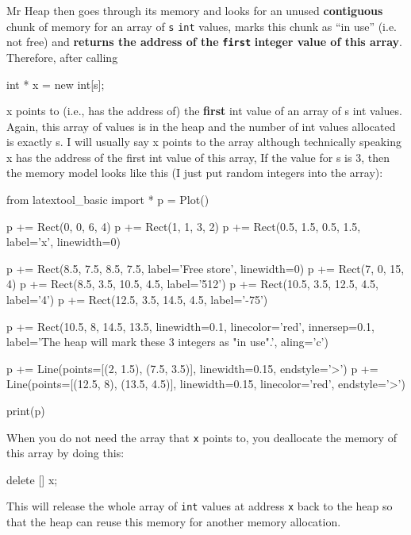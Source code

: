 Mr Heap then goes through its memory and looks for an unused
\textbf{contiguous} chunk of memory for an array of \texttt{s} \texttt{int}
values, marks this chunk as ``in use'' (i.e. not free) and
\textbf{returns the address of the }\texttt{\textbf{first}}\textbf{
integer value of this array}. Therefore, after calling

\begin{consolethree}[escapeinside=||]
int * x = new int[s];
\end{consolethree}

x points to (i.e., has the address of) the \textbf{first} int value of
an array of s int values. Again, this array of values is in the heap and
the number of int values allocated is exactly s. I will usually say x
points to the array although technically speaking x has the address of
the first int value of this array, If the value for s is 3, then the
memory model looks like this (I just put random integers into the
array):

\begin{python}
from latextool_basic import *
p = Plot()

p += Rect(0, 0, 6, 4)
p += Rect(1, 1, 3, 2)
p += Rect(0.5, 1.5, 0.5, 1.5, label='x', linewidth=0)

p += Rect(8.5, 7.5, 8.5, 7.5, label='Free store', linewidth=0)
p += Rect(7, 0, 15, 4)
p += Rect(8.5, 3.5, 10.5, 4.5, label='512')
p += Rect(10.5, 3.5, 12.5, 4.5, label='4')
p += Rect(12.5, 3.5, 14.5, 4.5, label='-75')

p += Rect(10.5, 8, 14.5, 13.5, linewidth=0.1, linecolor='red', innersep=0.1, label='The heap will mark these 3 integers as "in use".', aling='c')

p += Line(points=[(2, 1.5), (7.5, 3.5)], linewidth=0.15, endstyle='>')
p += Line(points=[(12.5, 8), (13.5, 4.5)], linewidth=0.15, linecolor='red', endstyle='>')

print(p)
\end{python}

When you do not need the array that \texttt{x} points to, you deallocate
the memory of this array by doing this:

\begin{consolethree}[escapeinside=||]
delete [] x;
\end{consolethree}

This will release the whole array of \texttt{int} values at address
\texttt{x} back to the heap so that the heap can reuse this memory for
another memory allocation.

